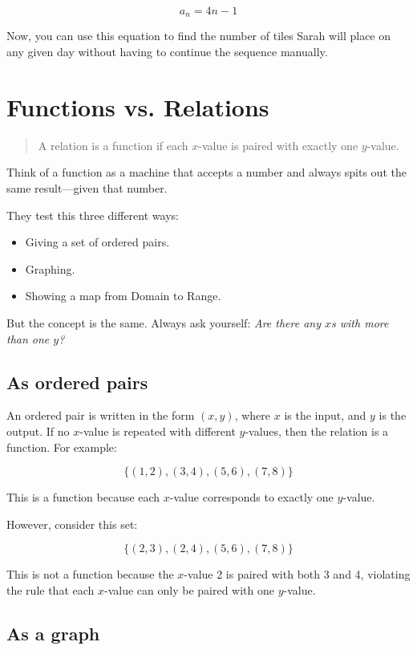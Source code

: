 \documentclass[12pt]{article}
\begin{document}
\[
  a_n = 4n - 1
\]

Now, you can use this equation to find the number of tiles Sarah will place on
any given day without having to continue the sequence manually.

\section{Functions vs. Relations}

\begin{quote}
  A relation is a function if each $x$-value is paired with exactly one
  $y$-value.
\end{quote}

Think of a function as a machine that accepts a number and always spits out the
same result---given that number.

They test this three different ways:

\begin{itemize}
  \item Giving a set of ordered pairs.
  \item Graphing.
  \item Showing a map from Domain to Range.
\end{itemize}

But the concept is the same. Always ask yourself: \emph{Are there any $x$s with
  more than one $y$?}


\subsection{As ordered pairs}

An ordered pair is written in the form $(x, y)$, where $x$ is the input, and $y$
is the output. If no $x$-value is repeated with different $y$-values, then the
relation is a function. For example:

\[
  \{(1,2),(3,4),(5,6),(7,8)\}
\]

This is a function because each $x$-value corresponds to exactly one $y$-value.

However, consider this set:

\[
  \{(2,3),(2,4),(5,6),(7,8)\}
\]

This is not a function because the $x$-value 2 is paired with both 3 and 4,
violating the rule that each $x$-value can only be paired with one $y$-value.

\subsection{As a graph}
\end{document}
